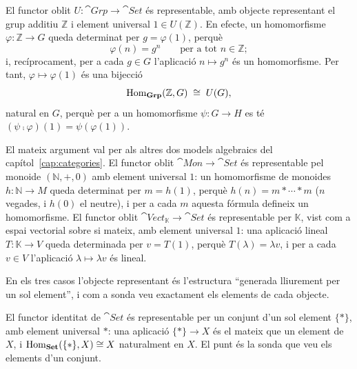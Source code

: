 \begin{exemple}\label{ex:rep-grp}
El functor oblit $U\colon\cat{Grp}\to\cat{Set}$ és representable, amb objecte representant el grup additiu $\mathbb Z$ i element universal $1\in U(\mathbb Z)$. En efecte, un homomorfisme $\varphi\colon\mathbb Z\to G$ queda determinat per $g=\varphi(1)$, perquè
\[
\varphi(n)=g^n\qquad\text{per a tot } n\in\mathbb Z;
\]
i, recíprocament, per a cada $g\in G$ l'aplicació $n\mapsto g^n$ és un homomorfisme. Per tant, $\varphi\mapsto\varphi(1)$ és una bijecció
\[
\operatorname{Hom}_{\mathbf{Grp}}(\mathbb Z,G)\;\cong\;U(G),
\]
natural en $G$, perquè per a un homomorfisme $\psi\colon G\to H$ es té $(\psi\comp\varphi)(1)=\psi(\varphi(1))$.

El mateix argument val per als altres dos models algebraics del capítol~\ref{cap:categories}. El functor oblit $\cat{Mon}\to\cat{Set}$ és representable pel monoide $(\mathbb N,+,0)$ amb element universal $1$: un homomorfisme de monoides $h\colon\mathbb N\to M$ queda determinat per $m=h(1)$, perquè $h(n)=m\ast\cdots\ast m$ ($n$ vegades, i $h(0)$ el neutre), i per a cada $m$ aquesta fórmula defineix un homomorfisme. El functor oblit $\cat{Vect}_{\mathbb K}\to\cat{Set}$ és representable per $\mathbb K$, vist com a espai vectorial sobre si mateix, amb element universal $1$: una aplicació lineal $T\colon\mathbb K\to V$ queda determinada per $v=T(1)$, perquè $T(\lambda)=\lambda v$, i per a cada $v\in V$ l'aplicació $\lambda\mapsto\lambda v$ és lineal.

En els tres casos l'objecte representant és l'estructura \enquote{generada lliurement per un sol element}, i com a sonda veu exactament els elements de cada objecte.
\end{exemple}

\begin{exemple}\label{ex:rep-punt}
El functor identitat de $\cat{Set}$ és representable per un conjunt d'un sol element $\{\ast\}$, amb element universal $\ast$: una aplicació $\{\ast\}\to X$ és el mateix que un element de $X$, i $\operatorname{Hom}_{\mathbf{Set}}(\{\ast\},X)\cong X$ naturalment en $X$. El punt és la sonda que veu els elements d'un conjunt.
\end{exemple}

